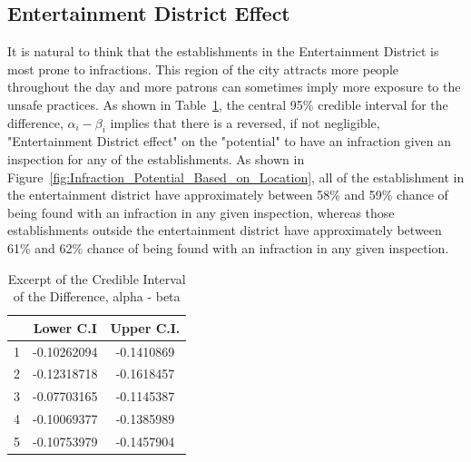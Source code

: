 \documentclass[twoside,onecolumn]{article}
\begin{document}
\subsection{Entertainment District Effect}
It is natural to think that the establishments in the Entertainment District is most prone to infractions. This region of the city attracts more people throughout the day and more patrons can sometimes imply more exposure to the unsafe practices. As shown in Table~\ref{table:alpha_beta_ci}, the central 95\% credible interval for the difference, $\alpha_i - \beta_i$ implies that there is a reversed, if not negligible, "Entertainment District effect" on the "potential" to have an infraction given an inspection for any of the establishments. As shown in Figure~\ref{fig:Infraction_Potential_Based_on_Location}, all of the establishment in the entertainment district have approximately between 58\% and 59\% chance of being found with an infraction in any given inspection, whereas those establishments outside the entertainment district have approximately between 61\% and 62\% chance of being found with an infraction in any given inspection.

\begin{table}[ht]
\caption{Excerpt of the Credible Interval of the Difference, alpha - beta} %
\centering %
\begin{tabular}{c c c} %
\hline\hline %
 & Lower C.I & Upper C.I. \\ [1ex] %
\hline %
1 & -0.10262094 & -0.1410869 \\ %
2 & -0.12318718 & -0.1618457 \\ 
3 & -0.07703165 & -0.1145387 \\
4 & -0.10069377 & -0.1385989 \\
5 & -0.10753979 & -0.1457904 \\ [1ex] %
\hline %
\end{tabular}
\label{table:alpha_beta_ci} %
\end{table}
\end{document}
